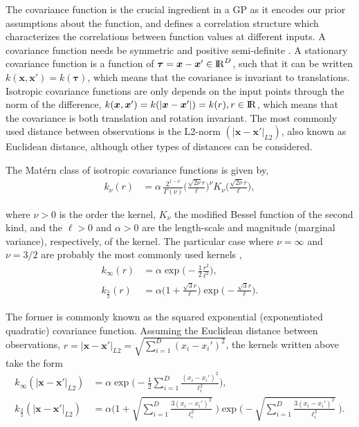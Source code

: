 \documentclass[onecolumn,a4paper,11pt]{article}
\begin{document}
The covariance function is the crucial ingredient in a GP as it encodes our prior assumptions about the function, and defines a correlation structure which characterizes the correlations between function values at different inputs. A covariance function needs be symmetric and positive semi-definite \citep{rasmussen2006gaussian}. A stationary covariance function is a function of $\bm{\tau}=\bm{x}-\bm{x}' \in {\rm I\!R}^D$, such that it can be written $k(\bm{x},\bm{x}') = k(\bm{\tau})$, which means that the covariance is invariant to translations. Isotropic covariance functions are only depends on the input points through the norm of the difference, $k(\bm{x},\bm{x}') = k(|\bm{x}-\bm{x}'|) = k(r), r\in {\rm I\!R}$, which means that the covariance is both translation and rotation invariant. The most commonly used distance between observations is the L2-norm $(|\bm{x}-\bm{x}'|_{L2})$, also known as Euclidean distance, although other types of distances can be considered. 

The Mat\'ern class of isotropic covariance functions is given by, 
%
\begin{align*}
k_{\nu}(r)&=\alpha \, \frac{2^{1-\nu}}{\Gamma(\nu)}\Big(\frac{\sqrt{2\nu}r}{\ell}\Big)^{\!\nu} \! K_{\nu} \Big(\frac{\sqrt{2\nu}r}{\ell}\Big),
\end{align*}

\noindent where $\nu > 0$ is the order the kernel, $K_{\nu}$ the modified Bessel function of the second kind, and the $\ell > 0$ and $\alpha > 0$ are the length-scale and magnitude (marginal variance), respectively, of the kernel. The particular case where $\nu=\infty$ and $\nu=3/2$ are probably the most commonly used kernels \citep{rasmussen2006gaussian}, 
%
\begin{align*}
k_{\infty}(r)&=\alpha \exp\!\! \big(\! -\frac{1}{2} \frac{r^2}{\ell^2}\big),  \\
k_{\frac{3}{2}}(r)&=\alpha\Big(1+\frac{\sqrt{3}r}{\ell}\Big) \! \exp\!\! \big(\! -\frac{\sqrt{3}r}{\ell}\big). 
\end{align*}

\noindent The former is commonly known as the squared exponential (exponentiated quadratic) covariance function. Assuming the Euclidean distance between observations, $r=|\bm{x}-\bm{x}'|_{L2}=\sqrt{\sum_{i=1}^{D}(x_i-x_i')^2}$, the kernels written above take the form
%
\begin{align*}
k_{\infty}(|\bm{x}-\bm{x}'|_{L2})&=\alpha \exp\!\!\Big(\! -\frac{1}{2} \sum_{i=1}^{D}\frac{(x_i-x_i')^2}{\ell_i^2}\Big),\\
k_{\frac{3}{2}}(|\bm{x}-\bm{x}'|_{L2})&=\alpha \bigg(1+\sqrt{\sum_{i=1}^{D}\frac{3(x_i-x_i')^2}{\ell_i^2}}\;\bigg) \! \exp\!\!\Big(\! - \sqrt{\sum_{i=1}^{D}\frac{3(x_i-x_i')^2}{\ell_i^2}}\;\Big). \\
\end{align*}
\end{document}
